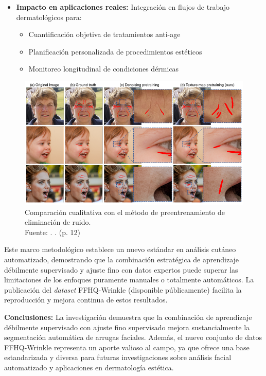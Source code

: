 \begin{itemize}
    \item \textbf{Impacto en aplicaciones reales:}
    Integración en flujos de trabajo dermatológicos para:
    \begin{itemize}[label=$\bullet$, leftmargin=1em]
        \item Cuantificación objetiva de tratamientos anti-age
        \item Planificación personalizada de procedimientos estéticos
        \item Monitoreo longitudinal de condiciones dérmicas
    \end{itemize}
\end{itemize}

\begin{figure}[H]
    \begin{center}
        \includegraphics[width=1\textwidth]{2/figures/resultant6.png}
        \caption[Comparación cualitativa con el método de preentrenamiento de eliminación de ruido]{Comparación cualitativa con el método de preentrenamiento de eliminación de ruido.\\
            Fuente: \cite{moon2024dermatology}. . (p. 12)}
        \label{2:resultsant6}
    \end{center}
\end{figure}

Este marco metodológico establece un nuevo estándar en análisis cutáneo automatizado, demostrando que la combinación estratégica de aprendizaje débilmente supervisado y ajuste fino con datos expertos puede superar las limitaciones de los enfoques puramente manuales o totalmente automáticos. La publicación del \textit{dataset} FFHQ-Wrinkle (disponible públicamente) facilita la reproducción y mejora continua de estos resultados.

\textbf{Conclusiones:}
La investigación demuestra que la combinación de aprendizaje débilmente supervisado con ajuste fino supervisado mejora sustancialmente la segmentación automática de arrugas faciales. Además, el nuevo conjunto de datos FFHQ-Wrinkle representa un aporte valioso al campo, ya que ofrece una base estandarizada y diversa para futuras investigaciones sobre análisis facial automatizado y aplicaciones en dermatología estética.
